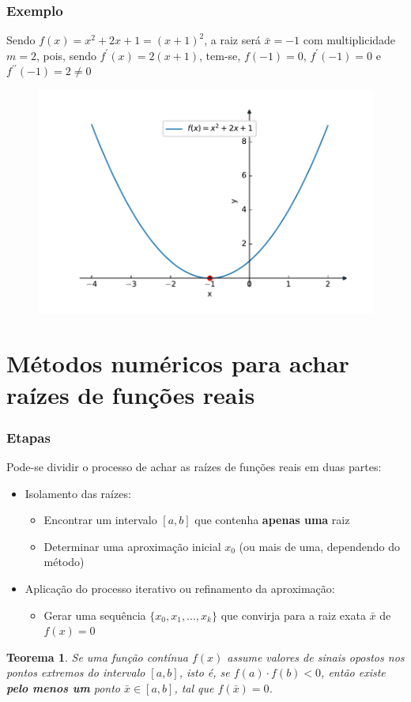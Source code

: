 \documentclass{beamer}
\newtheorem{teorema}[theorem]{Teorema}
\theoremstyle{mystyle}
\begin{document}
\begin{frame}
	\frametitle{Exemplo}
	Sendo $ f(x) = x^{2} + 2x + 1  = (x + 1)^{2} $, a raiz será $ \bar{x} = -1 $ com multiplicidade $ m = 2 $, pois, sendo $ f^{\prime}(x) = 2(x + 1) $, tem-se, $ f(-1) = 0 $, $ f^{\prime}(-1) = 0 $ e $ f^{\prime\prime}(-1) = 2 \neq 0 $
	\begin{figure}
		\centering
		\includegraphics[width=0.6\linewidth]{Figuras/grafico_02}
		\label{fig:grafico02}
	\end{figure}
\end{frame}

\section{Métodos numéricos para achar raízes de funções reais}

\begin{frame}
	\frametitle{Etapas}
	Pode-se dividir o processo de achar as raízes de funções reais em duas partes:
	\begin{itemize}
		\item Isolamento das raízes:
		\begin{itemize}
			\item Encontrar um intervalo $ [a, b] $ que contenha \textbf{apenas uma} raiz
			\item Determinar uma aproximação inicial $ x_{0} $ (ou mais de uma, dependendo do método)
		\end{itemize}
		\item Aplicação do processo iterativo ou refinamento da aproximação:
		\begin{itemize}
			\item Gerar uma sequência $ \{x_{0}, x_{1},\ldots, x_{k}\} $ que convirja para a raiz exata $ \bar{x} $ de $ f (x) = 0 $
		\end{itemize}
	\end{itemize}
\end{frame}

\begin{frame}
	\begin{teorema}
		Se uma função contínua $ f (x) $ assume valores de sinais opostos nos pontos extremos do intervalo $ [a, b] $, isto é, se $ f (a) \cdot f (b) < 0 $, então existe \textbf{pelo menos um} ponto $ \bar{x} \in [a, b] $, tal que	$ f (\bar{x}) = 0 $.		
	\end{teorema}
\end{frame}
\end{document}

